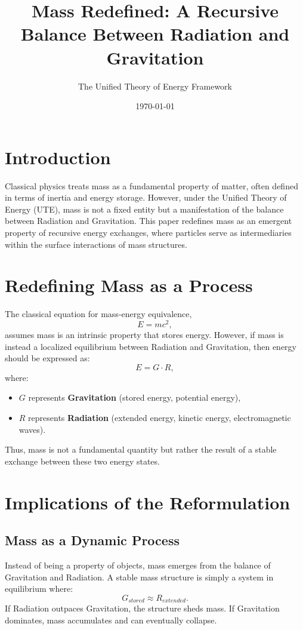 \documentclass{article}
\title{Mass Redefined: A Recursive Balance Between Radiation and Gravitation}
\author{The Unified Theory of Energy Framework}
\date{\today}
\begin{document}
\maketitle

\section{Introduction}
Classical physics treats mass as a fundamental property of matter, often defined in terms of inertia and energy storage. However, under the Unified Theory of Energy (UTE), mass is not a fixed entity but a manifestation of the balance between Radiation and Gravitation. This paper redefines mass as an emergent property of recursive energy exchanges, where particles serve as intermediaries within the surface interactions of mass structures.

\section{Redefining Mass as a Process}
The classical equation for mass-energy equivalence,
\begin{equation}
    E = mc^2,
\end{equation}
assumes mass is an intrinsic property that stores energy. However, if mass is instead a localized equilibrium between Radiation and Gravitation, then energy should be expressed as:
\begin{equation}
    E = G \cdot R,
\end{equation}
where:
\begin{itemize}
    \item $G$ represents \textbf{Gravitation} (stored energy, potential energy),
    \item $R$ represents \textbf{Radiation} (extended energy, kinetic energy, electromagnetic waves).
\end{itemize}

Thus, mass is not a fundamental quantity but rather the result of a stable exchange between these two energy states.

\section{Implications of the Reformulation}
\subsection{Mass as a Dynamic Process}
Instead of being a property of objects, mass emerges from the balance of Gravitation and Radiation. A stable mass structure is simply a system in equilibrium where:
\begin{equation}
    G_{stored} \approx R_{extended}.
\end{equation}
If Radiation outpaces Gravitation, the structure sheds mass. If Gravitation dominates, mass accumulates and can eventually collapse.
\end{document}
